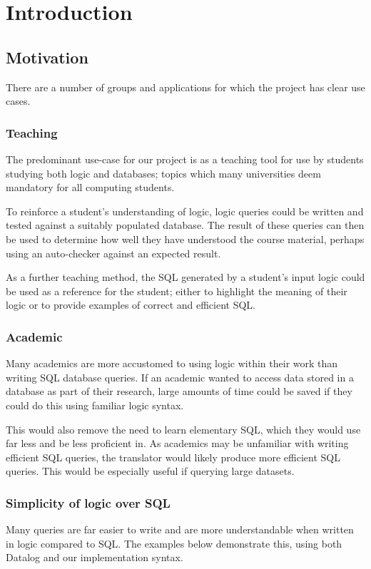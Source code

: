 \documentclass[a4paper, 11pt]{article}
\begin{document}
\section{Introduction}
  \subsection{Motivation}
    There are a number of groups and applications for which the project has
    clear use cases.

    \subsubsection{Teaching}
      The predominant use-case for our project is as a teaching tool for use by
      students studying both logic and databases; topics which many universities
      deem mandatory for all computing students.

      To reinforce a student's understanding of logic, logic queries could be
      written and tested against a suitably populated database. The result of
      these queries can then be used to determine how well they have understood
      the course material, perhaps using an auto-checker against an expected
      result.

      As a further teaching method, the SQL generated by a student's input logic
      could be used as a reference for the student; either to highlight the
      meaning of their logic or to provide examples of correct and efficient
      SQL.

    \subsubsection{Academic}
      Many academics are more accustomed to using logic within their work than
      writing SQL database queries. If an academic wanted to access data stored
      in a database as part of their research, large amounts of time could be
      saved if they could do this using familiar logic syntax.

      This would also remove the need to learn elementary SQL, which they would
      use far less and be less proficient in. As academics may be unfamiliar
      with writing efficient SQL queries, the translator would likely produce
      more efficient SQL queries. This would be especially useful if querying
      large datasets.

    \subsubsection{Simplicity of logic over SQL}
      Many queries are far easier to write and are more understandable when
      written in logic compared to SQL. The examples below demonstrate this,
      using both Datalog and our implementation syntax.
\end{document}
